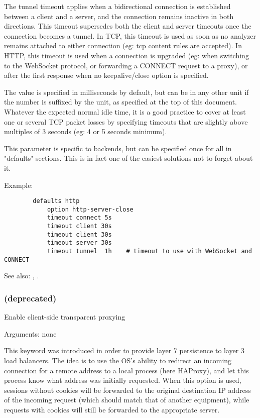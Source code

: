 {  The tunnel timeout applies when a bidirectional connection is established
  between a client and a server, and the connection remains inactive in both
  directions. This timeout supersedes both the client and server timeouts once
  the connection becomes a tunnel. In TCP, this timeout is used as soon as no
  analyzer remains attached to either connection (eg: tcp content rules are
  accepted). In HTTP, this timeout is used when a connection is upgraded (eg:
  when switching to the WebSocket protocol, or forwarding a CONNECT request
  to a proxy), or after the first response when no keepalive/close option is
  specified.

  The value is specified in milliseconds by default, but can be in any other
  unit if the number is suffixed by the unit, as specified at the top of this
  document. Whatever the expected normal idle time, it is a good practice to
  cover at least one or several TCP packet losses by specifying timeouts that
  are slightly above multiples of 3 seconds (eg: 4 or 5 seconds minimum).

  This parameter is specific to backends, but can be specified once for all in
  "defaults" sections. This is in fact one of the easiest solutions not to
  forget about it.

  Example:
  \begin{verbatim}
        defaults http
            option http-server-close
            timeout connect 5s
            timeout client 30s
            timeout client 30s
            timeout server 30s
            timeout tunnel  1h    # timeout to use with WebSocket and CONNECT
  \end{verbatim}

  See also: , .

\subsubsection[transparent]{ (deprecated)}

  Enable client-side transparent proxying


  Arguments: none

  This keyword was introduced in order to provide layer 7 persistence to layer
  3 load balancers. The idea is to use the OS's ability to redirect an incoming
  connection for a remote address to a local process (here HAProxy), and let
  this process know what address was initially requested. When this option is
  used, sessions without cookies will be forwarded to the original destination
  IP address of the incoming request (which should match that of another
  equipment), while requests with cookies will still be forwarded to the
  appropriate server.

}
